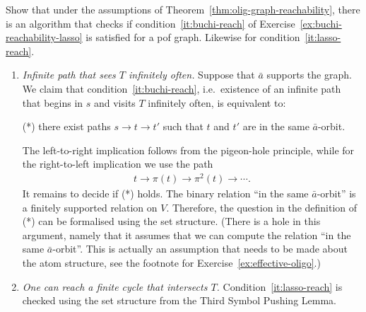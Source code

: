 \mikexercise
{\label{ex:buchi-reachability} Show that under the assumptions of Theorem~\ref{thm:olig-graph-reachability}, there is an algorithm that checks if condition~\ref{it:buchi-reach} of Exercise~\ref{ex:buchi-reachability-lasso} is satisfied for a pof graph. Likewise for condition~\ref{it:lasso-reach}.}{
\begin{enumerate}
	\item \emph{Infinite path that sees $T$ infinitely often.} Suppose that $\bar a$ supports the graph. We claim that condition~\ref{it:buchi-reach}, i.e.~existence of an infinite path that begins in $s$ and visits $T$ infinitely often, is equivalent to: 
	\begin{center}
		(*) there exist paths $s \to t \to t'$ such that $t$ and $t'$ are in the same $\bar a$-orbit.
	\end{center}
	The left-to-right implication follows from the pigeon-hole principle, while for the right-to-left implication we use the path
	\begin{align*}
		t \to \pi(t) \to \pi^2(t) \to \cdots .
	\end{align*}
	It remains to decide if (*) holds. The binary relation ``in the same $\bar a$-orbit'' is a finitely supported relation on $V$. Therefore, the question in the definition of (*) can be formalised using the set structure. (There is a hole in this argument, namely that it assumes that we can compute the relation ``in the same $\bar a$-orbit''. This is actually an assumption that needs to be made about the atom structure, see the footnote for Exercise~\ref{ex:effective-oligo}.)
	\item \emph{One can reach a finite cycle that intersects $T$.} Condition~\ref{it:lasso-reach} is checked using the set structure from the Third Symbol Pushing Lemma. 
\end{enumerate}

}



